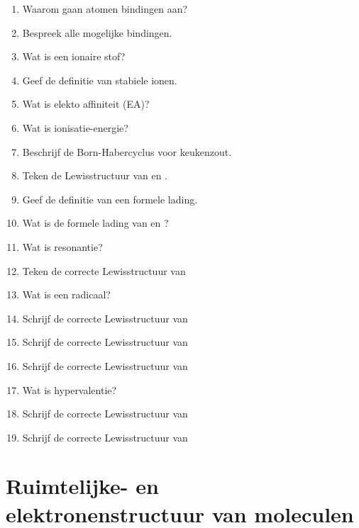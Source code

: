 \documentclass[a4paper,12pt]{article}
\begin{document}
    \begin{enumerate}
        \item Waarom gaan atomen bindingen aan?
        \item Bespreek alle mogelijke bindingen.
        \item Wat is een ionaire stof?
        \item Geef de definitie van stabiele ionen.
        \item Wat is elekto affiniteit (EA)?
        \item Wat is ionisatie-energie?
        \item Beschrijf de Born-Habercyclus voor keukenzout.
        \item Teken de Lewisstructuur van  en .
        \item Geef de definitie van een formele lading.
        \item Wat is de formele lading van  en ?
        \item Wat is resonantie?
        \item Teken de correcte Lewisstructuur van 
        \item Wat is een radicaal?
        \item Schrijf de correcte Lewisstructuur van 
        \item Schrijf de correcte Lewisstructuur van 
        \item Schrijf de correcte Lewisstructuur van 
        \item Wat is hypervalentie?
        \item Schrijf de correcte Lewisstructuur van 
        \item Schrijf de correcte Lewisstructuur van 
    \end{enumerate}

    \section{Ruimtelijke- en elektronenstructuur van moleculen}
\end{document}
